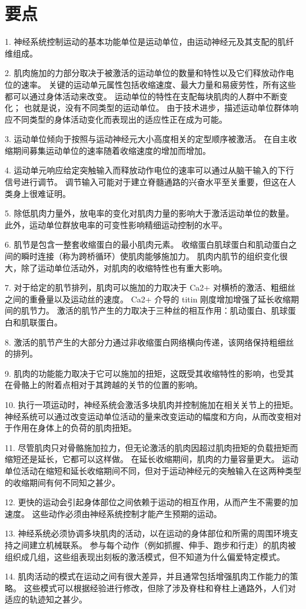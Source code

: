 \section{要点}
1. 神经系统控制运动的基本功能单位是运动单位，由运动神经元及其支配的肌纤维组成。 

2. 肌肉施加的力部分取决于被激活的运动单位的数量和特性以及它们释放动作电位的速率。 关键的运动单元属性包括收缩速度、最大力量和易疲劳性，所有这些都可以通过身体活动来改变。 运动单位的特性在支配每块肌肉的人群中不断变化； 也就是说，没有不同类型的运动单位。 由于技术进步，描述运动单位群体响应不同类型的身体活动变化而表现出的适应性正在成为可能。 

3. 运动单位倾向于按照与运动神经元大小高度相关的定型顺序被激活。 在自主收缩期间募集运动单位的速率随着收缩速度的增加而增加。 

4. 运动单元响应给定突触输入而释放动作电位的速率可以通过从脑干输入的下行信号进行调节。 调节输入可能对于建立脊髓通路的兴奋水平至关重要，但这在人类身上很难证明。 

5. 除低肌肉力量外，放电率的变化对肌肉力量的影响大于激活运动单位的数量。 此外，运动单位群放电率的可变性影响精细运动控制的水平。 

6. 肌节是包含一整套收缩蛋白的最小肌肉元素。 收缩蛋白肌球蛋白和肌动蛋白之间的瞬时连接（称为跨桥循环）使肌肉能够施加力。 肌肉内肌节的组织变化很大，除了运动单位活动外，对肌肉的收缩特性也有重大影响。 

7. 对于给定的肌节排列，肌肉可以施加的力取决于 Ca2+ 对横桥的激活、粗细丝之间的重叠量以及运动丝的速度。 Ca2+ 介导的 titin 刚度增加增强了延长收缩期间的肌节力。 激活的肌节产生的力取决于三种丝的相互作用：肌动蛋白、肌球蛋白和肌联蛋白。 

8. 激活的肌节产生的大部分力通过非收缩蛋白网络横向传递，该网络保持粗细丝的排列。 

9. 肌肉的功能能力取决于它可以施加的扭矩，这既受其收缩特性的影响，也受其在骨骼上的附着点相对于其跨越的关节的位置的影响。 

10. 执行一项运动时，神经系统会激活多块肌肉并控制施加在相关关节上的扭矩。 神经系统可以通过改变运动单位活动的量来改变运动的幅度和方向，从而改变相对于作用在身体上的负荷的肌肉扭矩。 

11. 尽管肌肉只对骨骼施加拉力，但无论激活的肌肉因超过肌肉扭矩的负载扭矩而缩短还是延长，它都可以这样做。 在延长收缩期间，肌肉的力量容量更大。 运动单位活动在缩短和延长收缩期间不同，但对于运动神经元的突触输入在这两种类型的收缩期间有何不同知之甚少。 

12. 更快的运动会引起身体部位之间依赖于运动的相互作用，从而产生不需要的加速度。 这些动作必须由神经系统控制才能产生预期的运动。 

13. 神经系统必须协调多块肌肉的活动，以在运动的身体部位和所需的周围环境支持之间建立机械联系。 参与每个动作（例如抓握、伸手、跑步和行走）的肌肉被组织成几组，这些组表现出刻板的激活模式，但不知道为什么偏爱特定模式。 

14. 肌肉活动的模式在运动之间有很大差异，并且通常包括增强肌肉工作能力的策略。 这些模式可以根据经验进行修改，但除了涉及脊柱和脊柱上通路外，人们对适应的轨迹知之甚少。

